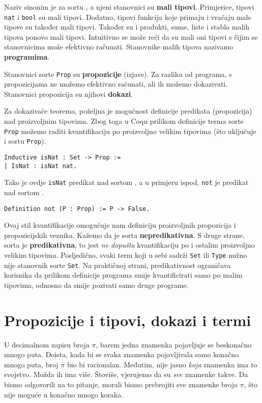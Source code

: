 Naziv \coqset{} sinonim je za sortu , a njeni stanovnici su \textbf{mali tipovi}.
Primjerice, tipovi \texttt{nat} i \texttt{bool} su mali tipovi.
Dodatno, tipovi funkcija koje primaju i vraćaju male tipove su također mali tipovi.
Također su i produkti, sume, liste i stabla malih tipova ponovo mali tipovi.
Intuitivno se može reći da su mali oni tipovi s čijim se stanovnicima može efektivno računati.
Stanovnike malih tipova nazivamo \textbf{programima}.

Stanovnici sorte \texttt{Prop} su \textbf{propozicije} (izjave).
Za razliku od programa, s propozicijama ne možemo efektivno računati, ali ih možemo dokazivati.
Stanovnici propozicija su njihovi \textbf{dokazi}.

Za dokazivače teorema, poželjna je mogućnost definicije predikata (propozicija) nad proizvoljnim tipovima.
Zbog toga u Coqu prilikom definicije terma sorte \texttt{Prop} možemo raditi kvantifikaciju po proizvoljno velikim tipovima
(što uključuje i sortu \texttt{Prop}).
\begin{verbatim}
Inductive isNat : Set -> Prop :=
| IsNat : isNat nat.
\end{verbatim}
\noindent Tako je ovdje \texttt{isNat} predikat nad sortom \coqset{}, a u primjeru ispod, \texttt{not} je predikat nad sortom \coqprop{}.
\begin{verbatim}
Definition not (P : Prop) := P -> False.
\end{verbatim}
\noindent Ovaj stil kvantifikacije omogućuje nam definiciju proizvoljnih propozicija i propozicijskih veznika.
Kažemo da je sorta \coqprop{} \textbf{nepredikativna}.
S druge strane, sorta \coqset{} je \textbf{predikativna}, to jest \textit{ne dopušta} kvantifikaciju po \coqset{} i ostalim proizvoljno velikim tipovima.
Posljedično, svaki term koji u sebi sadrži \texttt{Set} ili \texttt{Type} nužno nije stanovnik sorte \texttt{Set}.
Na praktičnoj strani, predikativnost ograničava korisnika da prilikom definicije programa smije kvantificirati samo po malim tipovima, odnosno da smije pozivati samo druge programe.


\section{Propozicije i tipovi, dokazi i termi}\label{sec:propozicije-i-tipovi}
U decimalnom zapisu broja \(\pi\), barem jedna znamenka pojavljuje se beskonačno mnogo puta.
Doista, kada bi se svaka znamenka pojavljivala samo konačno mnogo puta, broj \(\pi\) bio bi racionalan.
Međutim, nije jasno \textit{koja} znamenka ima to svojstvo.
Možda ih ima više. Štoviše, vjerujemo da su \textit{sve} znamenke takve.
Da bismo odgovorili na to pitanje, morali bismo prebrojiti sve znamenke broja \(\pi\),
što nije moguće u konačno mnogo koraka.

